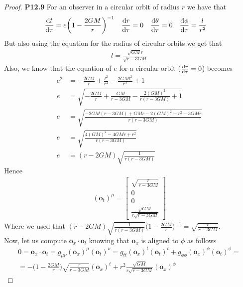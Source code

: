 \documentclass[11pt]{article}
\theoremstyle{definition}
\begin{document}
\cleardoublepage
\begin{proof}{\textbf{P12.9}}
    For an observer in a circular orbit of radius $r$ we have that
    \begin{align*}
        \dv{t}{\tau} &= e\bigg(1 - \frac{2GM}{r}\bigg)^{-1}
        \quad \dv{r}{\tau} = 0
        \quad \dv{\theta}{\tau} = 0
        \quad \dv{\phi}{\tau} = \frac{l}{r^2}
    \end{align*}
    But also using the equation for the radius of circular orbits we get that
    \begin{align*}
        l = \frac{\sqrt{GM}r}{\sqrt{r - 3GM}}
    \end{align*}
    Also, we know that the equation of $e$ for a circular orbit
    ($\dv{r}{\tau} = 0$) becomes
    \begin{align*}
        e^2 &= -\frac{2GM}{r} + \frac{l^2}{r^2} - \frac{2GMl^2}{r^3} + 1\\
        e &= \sqrt{-\frac{2GM}{r} + \frac{GM}{r - 3GM}
        - \frac{2(GM)^2}{r(r - 3GM)} + 1}\\
        e &= \sqrt{\frac{-2GM(r - 3GM) + GMr - 2(GM)^2 + r^2 - 3GMr}{r(r - 3GM)}}\\
        e &= \sqrt{\frac{4(GM)^2 - 4GMr + r^2}{r(r - 3GM)}}\\
        e &= (r - 2GM)\sqrt{\frac{1}{r(r - 3GM)}}
    \end{align*}
    Hence
    \begin{align*}
        (\bm{o}_t)^\mu = \begin{bmatrix}
        \sqrt{\frac{r}{r - 3GM}}\\
        0\\ 0 \\
        \frac{\sqrt{GM}}{r\sqrt{r - 3GM}}
        \end{bmatrix} 
    \end{align*}
    Where we used that
    $(r - 2GM)\sqrt{\frac{1}{r(r - 3GM)}}\bigg(1 - \frac{2GM}{r}\bigg)^{-1}
    =\sqrt{\frac{r}{r - 3GM}}$.\\
    Now, let us compute $\bm{o}_x\cdot \bm{o}_t$ knowing that $\bm{o}_x$ is
    aligned to $\phi$ as follows 
    \begin{align*}
        0 = \bm{o}_x \cdot \bm{o}_t
        = g_{\mu\nu} (\bm{o}_x)^\mu (\bm{o}_t)^\nu
        = g_{tt} (\bm{o}_x)^t (\bm{o}_t)^t + g_{\phi\phi} (\bm{o}_x)^\phi (\bm{o}_t)^\phi=\\
        = -\bigg(1 - \frac{2GM}{r}\bigg)\sqrt{\frac{r}{r - 3GM}} (\bm{o}_x)^t
        + r^2 \frac{\sqrt{GM}}{r\sqrt{r - 3GM}} (\bm{o}_x)^\phi

\end{align*}
\end{proof}
\end{document}
